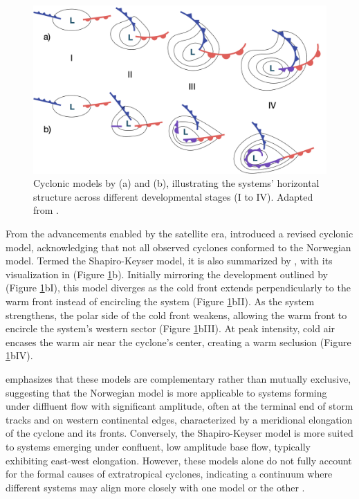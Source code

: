 \begin{figure}[h]
\begin{center}
\setcaptionmargin{1cm}
\includegraphics[width=0.7\columnwidth,angle=0]{fig/ciclones_modelos.png}
\caption[Bjerknes' and Shapiro-Keyser's Cyclonic Models]{Cyclonic models by \citet{bjerknes1919structure} (a) and \citet{shapiro1990fronts} (b), illustrating the systems' horizontal structure across different developmental stages (I to IV). Adapted from \citet{schultz1998effect}.}
\label{cyclone_models}
\end{center}
\end{figure}

From the advancements enabled by the satellite era, \citet{shapiro1990fronts} introduced a revised cyclonic model, acknowledging that not all observed cyclones conformed to the Norwegian model. Termed the Shapiro-Keyser model, it is also summarized by \citet{schultz1998effect}, with its visualization in (Figure \ref{cyclone_models}b). Initially mirroring the development outlined by \citet{bjerknes1922life} (Figure \ref{cyclone_models}bI), this model diverges as the cold front extends perpendicularly to the warm front instead of encircling the system (Figure \ref{cyclone_models}bII). As the system strengthens, the polar side of the cold front weakens, allowing the warm front to encircle the system's western sector (Figure \ref{cyclone_models}bIII). At peak intensity, cold air encases the warm air near the cyclone's center, creating a warm seclusion (Figure \ref{cyclone_models}bIV).

\citet{schultz1998effect} emphasizes that these models are complementary rather than mutually exclusive, suggesting that the Norwegian model is more applicable to systems forming under diffluent flow with significant amplitude, often at the terminal end of storm tracks and on western continental edges, characterized by a meridional elongation of the cyclone and its fronts. Conversely, the Shapiro-Keyser model is more suited to systems emerging under confluent, low amplitude base flow, typically exhibiting east-west elongation. However, these models alone do not fully account for the formal causes of extratropical cyclones, indicating a continuum where different systems may align more closely with one model or the other \citep{schultz1998effect}.

